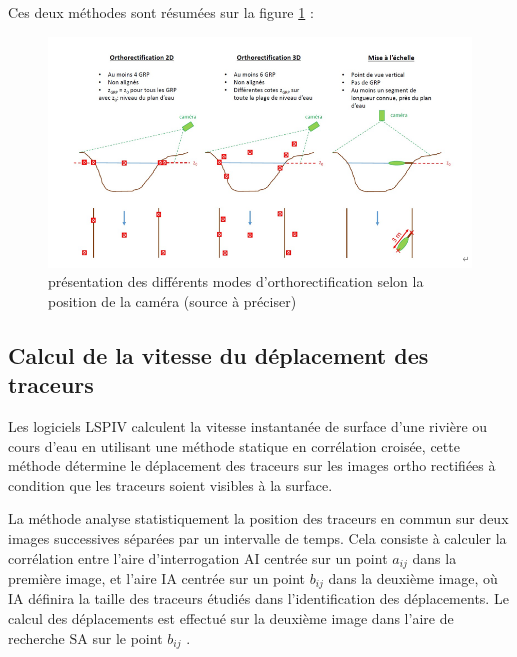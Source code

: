 \documentclass[
]{article}
\begin{document}
Ces deux méthodes sont résumées sur la figure \ref{fig:orthowang} :



\begin{figure}[H]
\includegraphics[width=1\linewidth,]{images/Orthowang} \caption{présentation des différents modes d'orthorectification selon la position de la caméra (source à préciser)}\label{fig:orthowang}
\end{figure}

\hypertarget{calcul-de-la-vitesse-du-duxe9placement-des-traceurs}{%
\subsection{Calcul de la vitesse du déplacement des traceurs}\label{calcul-de-la-vitesse-du-duxe9placement-des-traceurs}}

Les logiciels LSPIV calculent la vitesse instantanée de surface d'une rivière ou cours d'eau en utilisant une méthode statique en corrélation croisée, cette méthode détermine le déplacement des traceurs sur les images ortho rectifiées à condition que les traceurs soient visibles à la surface.

La méthode analyse statistiquement la position des traceurs en commun sur deux images successives séparées par un intervalle de temps. Cela consiste à calculer la corrélation entre l'aire d'interrogation \(\text{AI}\) centrée sur un point \(a_{ij}\) dans la première image, et l'aire \(\text{IA}\) centrée sur un point \(b_{ij}\) dans la deuxième image, où \(\text{IA}\) définira la taille des traceurs étudiés dans l'identification des déplacements. Le calcul des déplacements est effectué sur la deuxième image dans l'aire de recherche \(\text{SA}\) sur le point \(b_{ij}\) .
\end{document}
